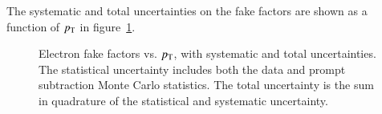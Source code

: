 The systematic and total uncertainties on the fake factors are shown as a function of $p_{\text{T}}$ in figure~\ref{fig:electron-fake-factor-uncertainties}.

\begin{figure}[htbp] 
  \centering
  \caption{Electron fake factors vs. $p_{\text{T}}$, with systematic and total uncertainties. The statistical uncertainty includes both the data and prompt subtraction Monte Carlo statistics. The total uncertainty is the sum in quadrature of the statistical and systematic uncertainty.}
  \label{fig:electron-fake-factor-uncertainties}
\end{figure}


